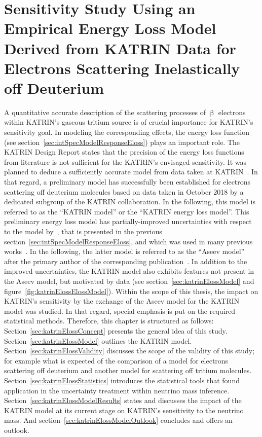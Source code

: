 \def\currentRootFolder{chapter/sensitivityStudyWithPreliminaryKatrinElossModel}
\def\currentFigureFolder{\currentRootFolder/fig}

\chapter{Sensitivity Study Using an Empirical Energy Loss Model Derived from KATRIN Data for Electrons Scattering Inelastically off Deuterium}
\label{sec:katrinEloss}
A quantitative accurate description of the scattering processes of $\upbeta$ electrons within KATRIN's gaseous tritium source is of crucial importance for KATRIN's sensitivity goal. In modeling the corresponding effects, the energy loss function (see section~\ref{sec:intSpecModelResponseEloss}) plays an important role. The KATRIN Design Report states that the precision of the energy loss functions from literature is not sufficient for the KATRIN's envisaged sensitivity. It was planned to deduce a sufficiently accurate model from data taken at KATRIN~\cite{Angrik:2005ep}. In that regard, a preliminary model has successfully been established for electrons scattering off deuterium molecules based on data taken in October 2018 by a dedicated subgroup of the KATRIN collaboration. In the following, this model is referred to as the ``KATRIN model'' or the ``KATRIN energy loss model''. This preliminary energy loss model has partially-improved uncertainties with respect to the model by~\cite{Aseev2000}, that is presented in the previous section~\ref{sec:intSpecModelResponseEloss}, and which was used in many previous works~\cite{Groh2015,Kleesiek2014, Kleesiek2019, SeitzM2019}. In the following, the latter model is referred to as the ``Aseev model'' after the primary author of the corresponding publication~\cite{Aseev2000}. In addition to the improved uncertainties, the KATRIN model also exhibits features not present in the Aseev model, but motivated by data (see section~\ref{sec:katrinElossModel} and figure~\ref{fig:katrinElossElossModel}). Within the scope of this thesis, the impact on KATRIN's sensitivity by the exchange of the Aseev model for the KATRIN model was studied. In that regard, special emphasis is put on the required statistical methods. Therefore, this chapter is structured as follows: Section~\ref{sec:katrinElossConcept} presents the general idea of this study. Section~\ref{sec:katrinElossModel} outlines the KATRIN model. Section~\ref{sec:katrinElossValidity} discusses the scope of the validity of this study; for example what is expected of the comparison of a model for electrons scattering off deuterium and another model for scattering off tritium molecules. Section~\ref{sec:katrinElossStatistics} introduces the statistical tools that found application in the uncertainty treatment within neutrino mass inference. Section~\ref{sec:katrinElossModelResults} states and discusses the impact of the KATRIN model at its current stage on KATRIN's sensitivity to the neutrino mass. And section~\ref{sec:katrinElossModelOutlook} concludes and offers an outlook.

